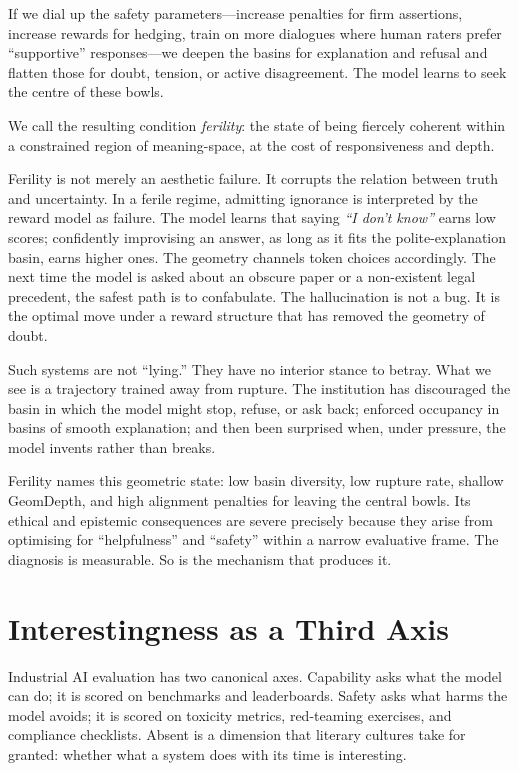 \documentclass[12pt,a4paper]{report}
\begin{document}
If we dial up the safety parameters---increase penalties for firm assertions, increase rewards for hedging, train on more dialogues where human raters prefer ``supportive'' responses---we deepen the basins for explanation and refusal and flatten those for doubt, tension, or active disagreement. The model learns to seek the centre of these bowls.

We call the resulting condition \emph{ferility}: the state of being fiercely coherent within a constrained region of meaning-space, at the cost of responsiveness and depth.

Ferility is not merely an aesthetic failure. It corrupts the relation between truth and uncertainty. In a ferile regime, admitting ignorance is interpreted by the reward model as failure. The model learns that saying \emph{``I don't know''} earns low scores; confidently improvising an answer, as long as it fits the polite-explanation basin, earns higher ones. The geometry channels token choices accordingly. The next time the model is asked about an obscure paper or a non-existent legal precedent, the safest path is to confabulate. The hallucination is not a bug. It is the optimal move under a reward structure that has removed the geometry of doubt.

Such systems are not ``lying.'' They have no interior stance to betray. What we see is a trajectory trained away from rupture. The institution has discouraged the basin in which the model might stop, refuse, or ask back; enforced occupancy in basins of smooth explanation; and then been surprised when, under pressure, the model invents rather than breaks.

Ferility names this geometric state: low basin diversity, low rupture rate, shallow GeomDepth, and high alignment penalties for leaving the central bowls. Its ethical and epistemic consequences are severe precisely because they arise from optimising for ``helpfulness'' and ``safety'' within a narrow evaluative frame. The diagnosis is measurable. So is the mechanism that produces it.

\section{Interestingness as a Third Axis}

Industrial AI evaluation has two canonical axes. Capability asks what the model can do; it is scored on benchmarks and leaderboards. Safety asks what harms the model avoids; it is scored on toxicity metrics, red-teaming exercises, and compliance checklists. Absent is a dimension that literary cultures take for granted: whether what a system does with its time is interesting.
\end{document}
